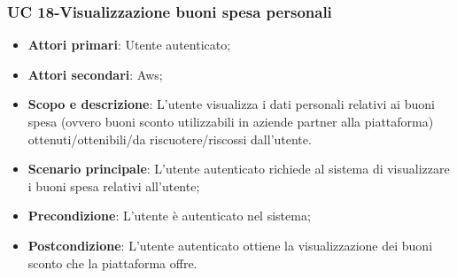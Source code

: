     \subsubsection{UC 18-Visualizzazione buoni spesa personali}  
      \begin{itemize}
        \item \textbf{Attori primari}: Utente autenticato;
        \item \textbf{Attori secondari}: Aws;
        \item \textbf{Scopo e descrizione}: L'utente visualizza i dati personali relativi ai buoni spesa (ovvero buoni sconto utilizzabili in aziende partner alla piattaforma) ottenuti/ottenibili/da riscuotere/riscossi dall'utente.
        \item \textbf{Scenario principale}: L'utente autenticato richiede al sistema di visualizzare i buoni spesa relativi all'utente;
        \item \textbf{Precondizione}: L'utente è autenticato nel sistema;
        \item \textbf{Postcondizione}: L'utente autenticato ottiene la visualizzazione dei buoni sconto che la piattaforma offre.
        \end{itemize}
  
    
            
